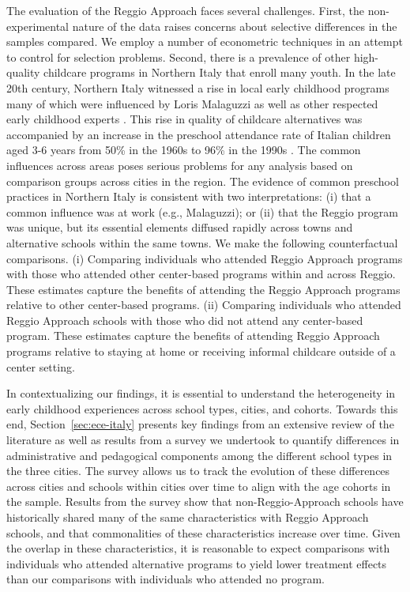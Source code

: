 The evaluation of the Reggio Approach faces several challenges. First, the non-experimental nature of the data raises concerns about selective differences in the samples compared. We employ a number of econometric techniques in an attempt to control for selection problems. Second, there is a prevalence of other high-quality childcare programs in Northern Italy that enroll many youth. In the late 20th century, Northern Italy witnessed a rise in local early childhood programs many of which were influenced by Loris Malaguzzi as well as other respected early childhood experts \citep{OECD_2001_Italy-Country-Note}. This rise in quality of childcare alternatives was accompanied by an increase in the preschool attendance rate of Italian children aged 3-6 years from 50\% in the 1960s to 96\% in the 1990s \citep{Hohnerlein_2015_Development-and-Diffusion}. The common influences across areas poses serious problems for any analysis based on comparison groups across cities in the region.  The evidence of common preschool practices in Northern Italy is consistent with two interpretations: (i) that a common influence was at work (e.g., Malaguzzi); or (ii) that the Reggio program was unique, but its essential elements diffused rapidly across towns and alternative schools within the same towns. We make the following counterfactual comparisons. (i) Comparing individuals who attended Reggio Approach programs with those who attended other center-based programs within and across Reggio. These estimates capture the benefits of attending the Reggio Approach programs relative to other center-based programs. (ii) Comparing individuals who attended Reggio Approach schools with those who did not attend any center-based program. These estimates capture the benefits of attending Reggio Approach programs relative to staying at home or receiving informal childcare outside of a center setting.

In contextualizing our findings, it is essential to understand the heterogeneity in early childhood experiences across school types, cities, and cohorts. Towards this end, Section~\ref{sec:ece-italy} presents key findings from an extensive review of the literature as well as results from a survey we undertook to quantify differences in administrative and pedagogical components among the different school types in the three cities. The survey allows us to track the evolution of these differences across cities and schools within cities over time to align with the age cohorts in the sample. Results from the survey show that non-Reggio-Approach schools have historically shared many of the same characteristics with Reggio Approach schools, and that commonalities of these characteristics increase over time. Given the overlap in these characteristics, it is reasonable to expect comparisons with individuals who attended alternative programs to yield lower treatment effects than our comparisons with individuals who attended no program.

